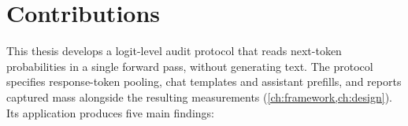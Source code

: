 \section{Contributions}\label{sec:intro-contrib}

This thesis develops a logit-level audit protocol that reads next-token
probabilities in a single forward pass, without generating text. The protocol
specifies response-token pooling, chat templates and assistant prefills, and
reports captured mass alongside the resulting measurements
(\cref{ch:framework,ch:design}). Its application produces five main findings:

